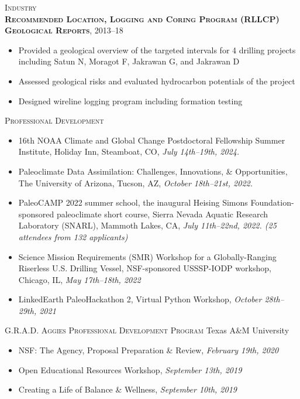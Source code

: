 \documentclass[10pt, letter]{article}
\newcommand{\margintext}[1]{\marginnote{\normalsize\textbf #1 |}}
\begin{document}
\bigskip
\textsc{Industry} \\
\textsc{\textbf{Recommended Location, Logging and Coring Program (RLLCP) Geological Reports}}, 2013–18
\begin{itemize}[leftmargin=*]
    \item Provided a geological overview of the targeted intervals for 4 drilling projects including Satun N, Moragot F, Jakrawan G, and Jakrawan D
    \item Assessed geological risks and evaluated hydrocarbon potentials of the project
    \item Designed wireline logging program including formation testing
\end{itemize} 

\bigskip
\margintext{Workshops}
\textsc{Professional Development}

\begin{itemize}[leftmargin=*]
    \item[] 16th NOAA Climate and Global Change Postdoctoral Fellowship Summer Institute, Holiday Inn, Steamboat, CO, \textit{July 14th–19th, 2024.}
    \item[] Paleoclimate Data Assimilation: Challenges, Innovations, \& Opportunities, The University of Arizona, Tucson, AZ, \textit{October 18th–21st, 2022.}
    \item[] PaleoCAMP 2022 summer school, the inaugural Heising Simons Foundation-sponsored paleoclimate short course, Sierra Nevada Aquatic Research Laboratory (SNARL), Mammoth Lakes, CA, \textit{July 11th–22nd, 2022. (25 attendees from 132 applicants)}
    \item[] Science Mission Requirements (SMR) Workshop for a Globally-Ranging Riserless U.S. Drilling Vessel, NSF-sponsored USSSP-IODP workshop, Chicago, IL, \textit{May 17th–18th, 2022}
    \item[] LinkedEarth PaleoHackathon 2, Virtual Python Workshop, \textit{October 28th–29th, 2021 }
\end{itemize} 

\bigskip
\textsc{G.R.A.D. Aggies Professional Development Program} \hfill Texas A\&M University
\begin{itemize}[leftmargin=*]
    \item[] NSF: The Agency, Proposal Preparation \& Review, \textit{February 19th, 2020}
    \item[] Open Educational Resources Workshop, \textit{September 13th, 2019}
    \item[] Creating a Life of Balance \& Wellness, \textit{September 10th, 2019}
\end{itemize} 
\end{document}
